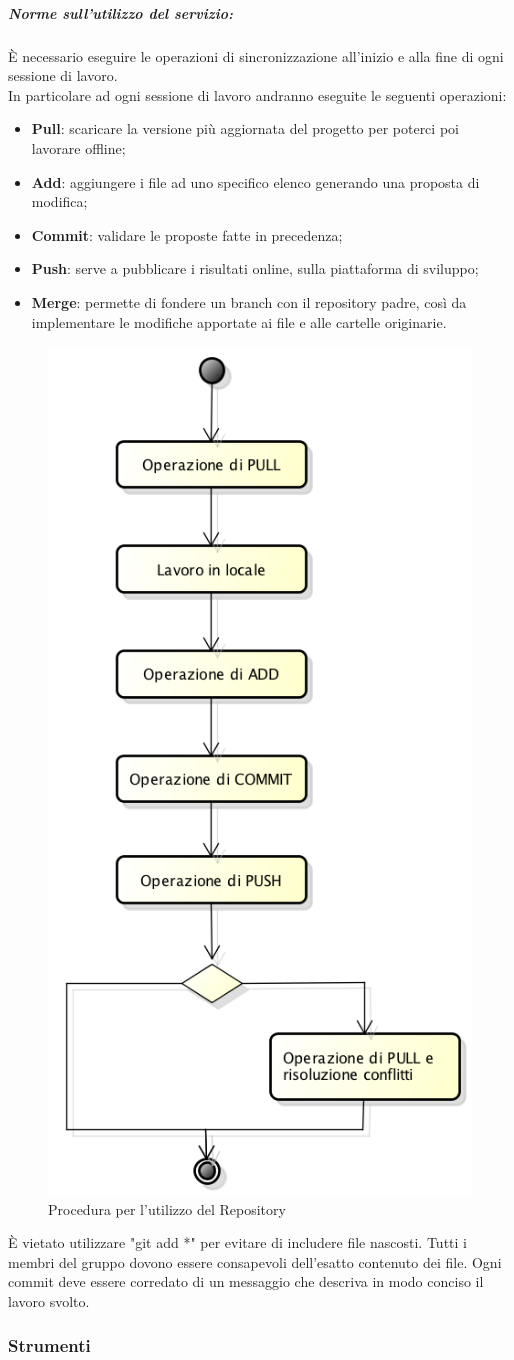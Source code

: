 \newpage
	\subparagraph{Norme sull'utilizzo del servizio:}
	È necessario eseguire le operazioni di sincronizzazione all'inizio e alla fine di ogni sessione di lavoro. \\
	In particolare ad ogni sessione di lavoro andranno eseguite le seguenti operazioni:
	\begin{itemize}
		\item \textbf{Pull}: scaricare la versione più aggiornata del progetto per poterci poi lavorare offline;
		\item \textbf{Add}: aggiungere i file ad uno specifico elenco generando una proposta di modifica;
		\item \textbf{Commit}: validare le proposte fatte in precedenza;
		\item \textbf{Push}: serve a pubblicare i risultati online, sulla piattaforma di sviluppo;
		\item \textbf{Merge}: permette di fondere un \gls{branch} con il \gls{repository} padre, così da implementare le modifiche apportate ai file e alle cartelle originarie.
	\end{itemize}
	\begin{figure}[h]
		\centering
		\includegraphics[width=0.5\linewidth]{img/proceduraRepository}
		\caption[Procedura per l'utilizzo del Repository]{Procedura per l'utilizzo del Repository}
		\label{fig:proceduraRepository}
	\end{figure}
	
	\noindent È vietato utilizzare "git add *" per evitare di includere file nascosti. Tutti i membri del gruppo dovono essere consapevoli dell'esatto contenuto dei file. Ogni commit deve essere corredato di un messaggio che descriva in modo \gls{conciso} il lavoro svolto.
				
\subsubsection{Strumenti}
	